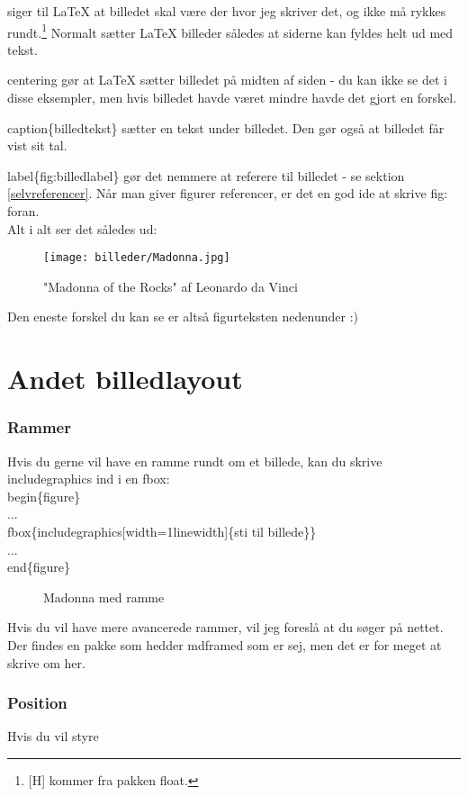 \noindent
[H] siger til LaTeX at billedet skal være der hvor jeg skriver det, og ikke må rykkes rundt.\footnote{[H] kommer fra pakken float.} Normalt sætter LaTeX billeder således at siderne kan fyldes helt ud med tekst.

\noindent
\bs centering gør at LaTeX sætter billedet på midten af siden - du kan ikke se det i disse eksempler, men hvis billedet havde været mindre havde det gjort en forskel.

\noindent
\bs caption\{billedtekst\} sætter en tekst under billedet. Den gør også at billedet får vist sit tal.

\noindent
\bs label\{fig:billedlabel\} gør det nemmere at referere til billedet - se sektion  \ref{selvreferencer}. Når man giver figurer referencer, er det en god ide at skrive fig: foran.\\

\noindent
Alt i alt ser det således ud:

\begin{figure}[H]
\centering
\texttt{[image: billeder/Madonna.jpg]}
\caption{"Madonna of the Rocks" af Leonardo da Vinci}
\label{fig:madonna_standard}
\end{figure}

Den eneste forskel du kan se er altså figurteksten nedenunder :)

\section{Andet billedlayout}
\subsubsection{Rammer}
Hvis du gerne vil have en ramme rundt om et billede, kan du skrive \bs includegraphics ind i en \bs fbox:\\

\indent \bs begin\{figure\}\\
\indent ... \\
\indent \bs fbox\{\bs includegraphics[width=1\bs linewidth]\{sti til billede\}\}\\
\indent ... \\
\indent \bs end\{figure\}\\

\begin{figure}[H]
\centering
{}
\caption{Madonna med ramme}
\label{fig:madonna_ramme}
\end{figure}

\noindent
Hvis du vil have mere avancerede rammer, vil jeg foreslå at du søger på nettet. Der findes en pakke som hedder mdframed som er sej, men det er for meget at skrive om her. 

\subsubsection{Position}
Hvis du vil styre 

 